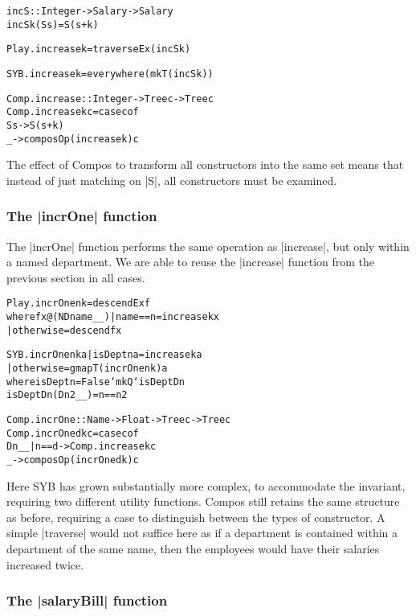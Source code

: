 \documentclass[preprint]{sigplanconf}
\newenvironment{code}{\begin{alltt}\small}{\end{alltt}}
\begin{document}
\begin{code}
incS :: Integer -> Salary -> Salary
incS k (S s) = S (s + k)

Play.increase k = traverseEx (incS k)

SYB.increase k = everywhere (mkT (incS k))

Comp.increase :: Integer -> Tree c -> Tree c
Comp.increase k c = case c of
    S s -> S (s + k)
    _ -> composOp (increase k) c
\end{code}

The effect of Compos to transform all constructors into the same set means that instead of just matching on |S|, all constructors must be examined.

\subsubsection{The |incrOne| function}

The |incrOne| function performs the same operation as |increase|, but only within a named department. We are able to reuse the |increase| function from the previous section in all cases.

\begin{code}
Play.incrOne n k = descendEx f
    where f x@(ND name _ _)  | name == n  = increase k x
                             | otherwise  = descend f x

SYB.incrOne n k a  | isDept n a  = increase k a
                   | otherwise   = gmapT (incrOne n k) a
    where  isDept n = False `mkQ` isDeptD n
           isDeptD n (D n2 _ _) = n == n2

Comp.incrOne :: Name -> Float -> Tree c -> Tree c
Comp.incrOne d k c = case c of
    D n _ _ | n == d -> Comp.increase k c
    _ -> composOp (incrOne d k) c
\end{code}

Here SYB has grown substantially more complex, to accommodate the invariant, requiring two different utility functions. Compos still retains the same structure as before, requiring a case to distinguish between the types of constructor. A simple |traverse| would not suffice here as if a department is contained within a department of the same name, then the employees would have their salaries increased twice.

\subsubsection{The |salaryBill| function}
\end{document}
